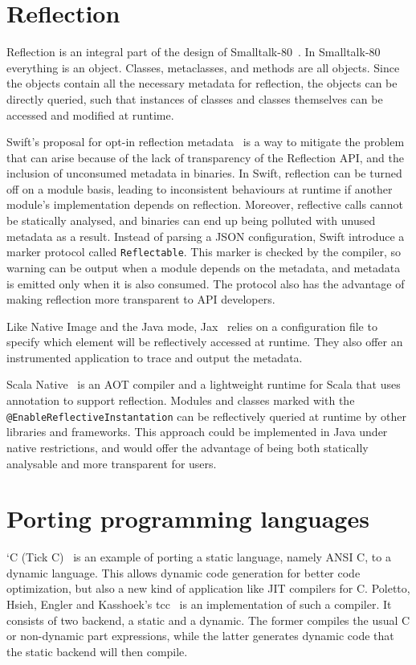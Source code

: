 \section{Reflection}
Reflection is an integral part of the design of Smalltalk-80~\cite{goldberg_smalltalk-80_1983}. In Smalltalk-80 everything is an object. Classes, metaclasses, and methods are all objects. Since the objects contain all the necessary metadata for reflection, the objects can be directly queried, such that instances of classes and classes themselves can be accessed and modified at runtime. 

Swift's proposal for opt-in reflection metadata~\cite{noauthor_pitch_2022} is a way to mitigate the problem that can arise because of the lack of transparency of the Reflection API, and the inclusion of unconsumed metadata in binaries. In Swift, reflection can be turned off on a module basis, leading to inconsistent behaviours at runtime if another module's implementation depends on reflection. Moreover, reflective calls cannot be statically analysed, and binaries can end up being polluted with unused metadata as a result. Instead of parsing a JSON configuration, Swift introduce a marker protocol called \verb|Reflectable|. This marker is checked by the compiler, so warning can be output when a module depends on the metadata, and metadata is emitted only when it is also consumed. The protocol also has the advantage of making reflection more transparent to API developers.

Like Native Image and the Java mode, Jax~\cite{tip_practical_1999} relies on a configuration file to specify which element will be reflectively accessed at runtime. They also offer an instrumented application to trace and output the metadata.

Scala Native~\cite{noauthor_scala_nodate} is an AOT compiler and a lightweight runtime for Scala that uses annotation to support reflection. Modules and classes marked with the \verb|@EnableReflectiveInstantation| can be reflectively queried at runtime by other libraries and frameworks. 
This approach could be implemented in Java under native restrictions, and would offer the advantage of being both statically analysable and more transparent for users.

\section{Porting programming languages}
`C (Tick C)~\cite{engler_c_1996} is an example of porting a static language, namely ANSI C, to a dynamic language. This allows dynamic code generation for better code optimization, but also a new kind of application like JIT compilers for C. Poletto, Hsieh, Engler and Kasshoek's tcc~\cite{poletto_c_1999} is an implementation of such a compiler. It consists of two backend, a static and a dynamic.
The former compiles the usual C or non-dynamic part expressions, while the latter generates dynamic code that the static backend will then compile.


